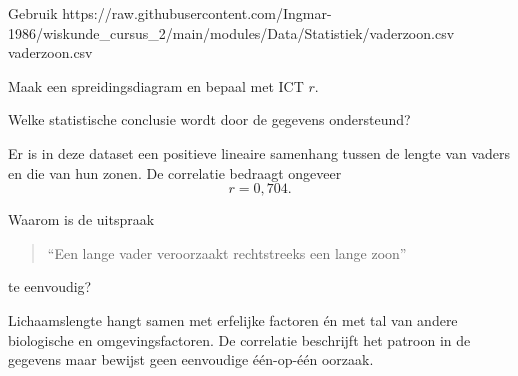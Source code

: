 \documentclass{ximera}
\begin{document}
\begin{oefening}{\oefU \ESS}

Gebruik \csv
{https://raw.githubusercontent.com/Ingmar-1986/wiskunde_cursus_2/main/modules/Data/Statistiek/vaderzoon.csv}
{vaderzoon.csv}

Maak een spreidingsdiagram en bepaal met ICT $r$.

\begin{question}
Welke statistische conclusie wordt door de gegevens ondersteund?

\begin{oplossing}
Er is in deze dataset een positieve lineaire samenhang tussen de lengte
van vaders en die van hun zonen. De correlatie bedraagt ongeveer
\[
r=0{,}704.
\]
\end{oplossing}
\end{question}

\begin{question}
Waarom is de uitspraak
\begin{quote}
``Een lange vader veroorzaakt rechtstreeks een lange zoon''
\end{quote}
te eenvoudig?

\begin{oplossing}
Lichaamslengte hangt samen met erfelijke factoren én met tal van andere
biologische en omgevingsfactoren. De correlatie beschrijft het patroon
in de gegevens maar bewijst geen eenvoudige één-op-één oorzaak.
\end{oplossing}
\end{question}

\end{oefening}
\end{document}
